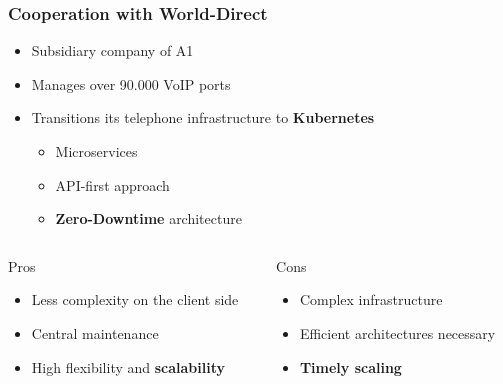 \documentclass[11pt,t,usepdftitle=false,aspectratio=169]{beamer}
\begin{document}
\begin{frame}
	\frametitle{Cooperation with {\color{uibkblue} World-Direct}}
	
	
	\begin{itemize}
		\item Subsidiary company of A1
		\item Manages over 90.000 VoIP ports
		\item Transitions its telephone infrastructure to \textbf{\color{uibkorange} Kubernetes}
		\begin{itemize}
			\item Microservices
			\item API-first approach
			\item \textbf{{\color{uibkorange} Zero-Downtime}} architecture
		\end{itemize}
	\end{itemize}
	
	\begin{columns}
		\begin{column}{0.5\textwidth}		
			\begin{block}{Pros}
				\begin{itemize}
					\item Less complexity on the client side
					\item Central maintenance
					\item High flexibility and \textbf{\color{uibkorange} scalability}
				\end{itemize}
			\end{block}
		\end{column}
		
		\begin{column}{0.5\textwidth}		
			\begin{block}{Cons}
				\begin{itemize}
					\item Complex infrastructure
					\item Efficient architectures necessary
					\item \textbf{\color{red} Timely scaling}
				\end{itemize}
			\end{block}
		\end{column}
	\end{columns}
\end{frame}
\end{document}
